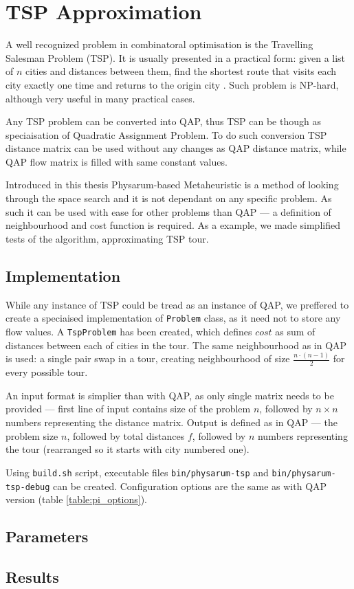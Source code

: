 \chapter{TSP Approximation}
\label{chapter:tsp}

A well recognized problem in combinatoral optimisation is the Travelling Salesman Problem (TSP). It is usually presented in a practical form: given a list of $n$ cities and distances between them, find the shortest route that visits each city exactly one time and returns to the origin city \cite{kruskal1956shortest}. Such problem is NP-hard, although very useful in many practical cases.

Any TSP problem can be converted into QAP, thus TSP can be though as speciaisation of Quadratic Assignment Problem. To do such conversion TSP distance matrix can be used without any changes as QAP distance matrix, while QAP flow matrix is filled with same constant values.

Introduced in this thesis Physarum-based Metaheuristic is a method of looking through the space search and it is not dependant on any specific problem. As such it can be used with ease for other problems than QAP --- a definition of neighbourhood and cost function is required. As a example, we made simplified tests of the algorithm, approximating TSP tour.

\section*{Implementation}

While any instance of TSP could be tread as an instance of QAP, we preffered to create a speciaised implementation of \texttt{Problem} class, as it need not to store any flow values. A \texttt{TspProblem} has been created, which defines $cost$ as sum of distances between each of cities in the tour. The same neighbourhood as in QAP is used: a single pair swap in a tour, creating neighbourhood of size $\frac{n\cdot(n-1)}{2}$ for every possible tour.

An input format is simplier than with QAP, as only single matrix needs to be provided --- first line of input contains size of the problem $n$, followed by $n{\times}n$ numbers representing the distance matrix. Output is defined as in QAP --- the problem size $n$, followed by total distances $f$, followed by $n$ numbers representing the tour (rearranged so it starts with city numbered one).

Using \texttt{build.sh} script, executable files \texttt{bin/physarum-tsp} and \texttt{bin/physarum-tsp-debug} can be created. Configuration options are the same as with QAP version (table \ref{table:pi_options}).

\section*{Parameters}

\section*{Results}
